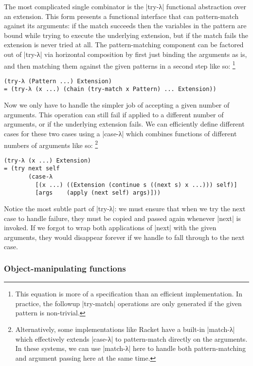 The most complicated single combinator is the \scm|try-λ| functional abstraction over an extension.
This form presents a functional interface that can pattern-match against its arguments:
if the match succeeds then the variables in the pattern are bound while trying to execute the underlying extension,
but if the match fails the extension is never tried at all.
The pattern-matching component can be factored out of \scm|try-λ| via horizontal composition by first just binding the arguments as is, and then matching them against the given patterns in a second step like so:%
\footnote{This equation is more of a specification than an efficient implementation.
  In practice, the followup \scm|try-match| operations are only generated if the given pattern is non-trivial.}
\begin{verbatim}
(try-λ (Pattern ...) Extension)
= (try-λ (x ...) (chain (try-match x Pattern) ... Extension))
\end{verbatim}
Now we only have to handle the simpler job of accepting a given number of arguments.  This operation can still fail if applied to a different number of arguments, or if the underlying extension fails.
We can efficiently define different cases for these two cases using a \scm|case-λ| which combines functions of different numbers of arguments like so:
\footnote{Alternatively, some implementations like Racket have a built-in \scm|match-λ| which effectively extends \scm|case-λ| to pattern-match directly on the arguments.
  In these systems, we can use \scm|match-λ| here to handle both pattern-matching and argument passing here at the same time.}
\begin{verbatim}
(try-λ (x ...) Extension)
= (try next self
       (case-λ
         [(x ...) ((Extension (continue s ((next s) x ...))) self)]
         [args    (apply (next self) args)]))
\end{verbatim}
Notice the most subtle part of \scm|try-λ|:
we must ensure that when we try the next case to handle failure, they must be copied and passed again whenever \scm|next| is invoked.
If we forgot to wrap both applications of \scm|next| with the given arguments, they would disappear forever if we handle to fall through to the next case.

\subsubsection{Object-manipulating functions}

